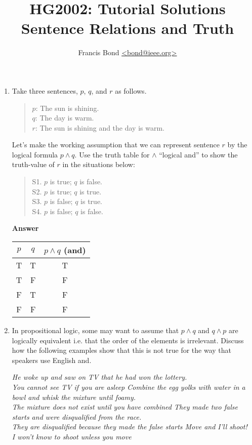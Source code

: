 \documentclass[a4paper]{article}
\title{\vspace*{-30mm}HG2002: Tutorial Solutions \\  Sentence Relations and Truth}
\author{Francis Bond \url{<bond@ieee.org>}}
\date{}%
\newcommand{\ix}{\ex\it}
\begin{document}
\maketitle


\begin{enumerate}
\item Take three sentences, $p$, $q$, and $r$ as follows. 

  \begin{quotation}
    \noindent $p$: The sun is shining. \\
    $q$: The day is warm. \\
    $r$: The sun is shining and the day is warm. 
  \end{quotation}

  Let’s make the working assumption that we can represent sentence $r$
  by the logical formula $p \wedge q$. Use the truth table for $\wedge$ ``logical and'' to
  show the truth-value of $r$ in the situations below:
  \begin{quotation}
    \noindent S1. $p$ is true; $q$ is false.\\
    S2. $p$ is true; $q$ is true.\\
    S3. $p$ is false; $q$ is true. \\
    S4. $p$ is false; $q$ is false.
  \end{quotation}
  \textbf{Answer}
  \begin{center}
  \begin{tabular}{|c|c|c|}
    \hline
    $p$ & $q$ & $p \wedge q$ (and)\\
    \hline
    \hline
    T & T & T  \\ 
    T & F & F  \\  
    F & T & F \\ 
    F & F & F \\ \hline
  \end{tabular}
\end{center}

\item  In propositional logic, some may want to assume that $p \wedge q$ and 
$q \wedge p$ are logically
equivalent i.e. that the order of the elements is irrelevant. Discuss how the following
examples show that this is not true for the way that speakers use English and. 
\begin{exe}
  \ix He woke up and saw on TV that he had won the lottery.
  \\ \textnormal{You cannot see TV if you are asleep}
  \ix Combine the egg yolks with water in a bowl and whisk the mixture until 
  foamy.
  \\ \textnormal{The mixture does not exist until you have combined}
  \ix  They made two false starts and were disqualified from the race.
  \\ \textnormal{They are disqualified because they made the false starts}
  \ix Move and I'll shoot!
  \\ \textnormal{I won't know to shoot unless you move}
\end{exe}


\end{enumerate}
\end{document}
